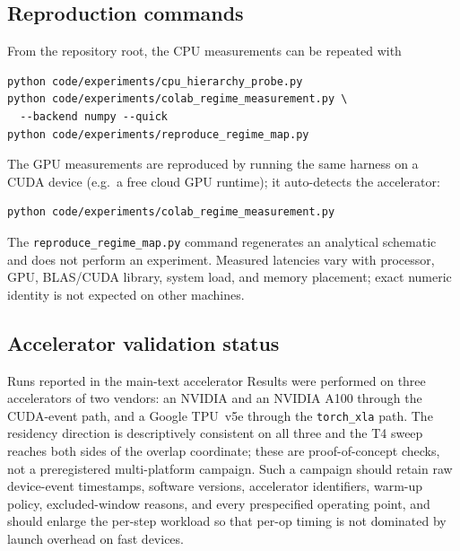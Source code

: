 \subsection{Reproduction commands}
From the repository root, the CPU measurements can be repeated with
\begin{verbatim}
python code/experiments/cpu_hierarchy_probe.py
python code/experiments/colab_regime_measurement.py \
  --backend numpy --quick
python code/experiments/reproduce_regime_map.py
\end{verbatim}
The GPU measurements are reproduced by running the same harness on a
CUDA device (e.g.\ a free cloud GPU runtime); it auto-detects the accelerator:
\begin{verbatim}
python code/experiments/colab_regime_measurement.py
\end{verbatim}
The \texttt{reproduce\_regime\_map.py} command regenerates an analytical
schematic and does not perform an experiment. Measured latencies vary with
processor, GPU, BLAS/CUDA library, system load, and memory placement; exact
numeric identity is not expected on other machines.

\subsection{Accelerator validation status}
Runs reported in the main-text accelerator Results were performed on three
accelerators of two vendors: an NVIDIA \GpuDevice{} and an NVIDIA A100 through the
CUDA-event path, and a Google TPU~v5e through the \texttt{torch\_xla} path. The
residency direction is descriptively consistent on all three and the T4 sweep
reaches both sides of the overlap coordinate; these are proof-of-concept checks,
not a preregistered multi-platform
campaign. Such a campaign should retain raw device-event timestamps, software
versions, accelerator identifiers, warm-up policy, excluded-window reasons, and
every prespecified operating point, and should enlarge the per-step workload so
that per-op timing is not dominated by launch overhead on fast devices.
